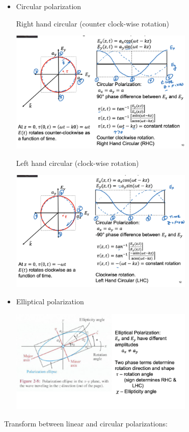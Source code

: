 \documentclass[10pt]{article}
\begin{document}
\begin{enumerate}
\begin{itemize}
	\item Circular polarization
	
	Right hand circular (counter clock-wise rotation)
	
	\includegraphics[width=0.69\textwidth]{figs/RHCpolarization.png}
	
	Left hand circular (clock-wise rotation)
	
	\includegraphics[width=0.69\textwidth]{figs/LHCpolarization.png}
	
	
	\item Elliptical polarization
	
	\includegraphics[width=0.69\textwidth]{figs/elipticalpolarization.png}
	
	\end{itemize}
	
	Transform between linear and circular polarizations:
	

\end{enumerate}
\end{document}
